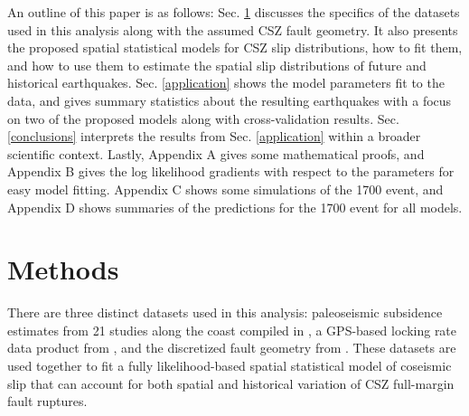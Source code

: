 {An outline of this paper is as follows: Sec. \ref{methods} discusses the specifics of the datasets used in this analysis along with the assumed CSZ fault geometry.  It also presents the proposed spatial statistical models for CSZ slip distributions, how to fit them, and how to use them to estimate the spatial slip distributions of future and historical earthquakes.  Sec. \ref{application} shows the model parameters fit to the data, and gives summary statistics about the resulting earthquakes with a focus on two of the proposed models along with cross-validation results.  Sec. \ref{conclusions} interprets the results from Sec. \ref{application} within a broader scientific context.  Lastly, Appendix A gives some mathematical proofs, and Appendix B gives the log likelihood gradients with respect to the parameters for easy model fitting.  Appendix C shows some simulations of the 1700 event, and Appendix D shows summaries of the predictions for the 1700 event for all models.

\section{Methods}
\label{methods}
There are three distinct datasets used in this analysis: paleoseismic subsidence estimates from 21 studies along the coast compiled in \citet{leonard2010}, a GPS-based locking rate data product from \citet{pollitz2017}, and the discretized fault geometry from \citet{faultGeom}.  These datasets are used together to fit a fully likelihood-based spatial statistical model of coseismic slip that can account for both spatial and historical variation of CSZ full-margin fault ruptures.

}
